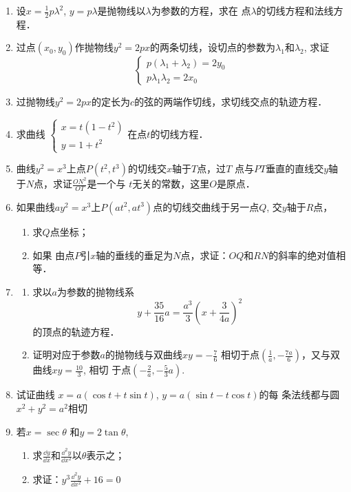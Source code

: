 \begin{ex}
\begin{enumerate}
    \item 设$x=\frac{1}{2}p\lambda^2$, $y=p\lambda$是抛物线以$\lambda$为参数的方程，求在
    点$\lambda$的切线方程和法线方程．
    \item 过点$(x_0,y_0)$作抛物线$y^2=2px$的两条切线，设切点的参数为$\lambda_1$和$\lambda_2$, 求证
    \[\begin{cases}
        p(\lambda_1+\lambda_2)=2y_0\\
        p\lambda_1\lambda_2=2x_0
    \end{cases}\]
    \item 过抛物线$y^2=2px$的定长为$c$的弦的两端作切线，求切线交点的轨迹方程．
    
    \item 求曲线
    $\begin{cases}
        x=t (1-t^2) \\ y=1+t^2
    \end{cases}$在点$t$的切线方程．

\item 曲线$y^2=x^3$上点$P(t^2,t^3)$的切线交$x$轴于$T$点，过$T$
点与$PT$垂直的直线交$y$轴于$N$点，求证$\frac{ON^2}{OT}$是一个与
$t$无关的常数，这里$O$是原点．
\item 如果曲线$ay^2=x^3$上$P(at^2,at^3)$点的切线交曲线于另一点$Q$, 交$y$轴于$R$点，
\begin{enumerate}
    \item 求$Q$点坐标；
    \item 如果
由点$P$引$x$轴的垂线的垂足为$N$点，求证：$OQ$和$RN$的斜率的绝对值相等．
\end{enumerate}
\item \begin{enumerate}
    \item 求以$a$为参数的抛物线系
\[y+\frac{35}{16}a=\frac{a^3}{3}\left(x+\frac{3}{4a}\right)^2\]
的顶点的轨迹方程．
\item 证明对应于参数$a$的抛物线与双曲线$xy=-\frac{7}{6}$ 
相切于点$\left(\frac{1}{a},-\frac{7a}{6}\right)$，又与双曲线$xy=\frac{10}{3}$, 相切
于点$\left(-\frac{2}{a},-\frac{5}{3}a\right)$.
\end{enumerate} 

\item 试证曲线
$x=a(\cos t+t\sin t)$, $y=a(\sin t-t\cos t)$的每
条法线都与圆$x^2+y^2=a^2$相切

\item 若$x=\sec\theta$ 和$y=2\tan\theta$,
\begin{enumerate}
    \item 求$\frac{\dd y}{\dd x}$和$\frac{\dd^2 y}{\dd x^2}$以$\theta$表示之；
\item 求证：$y^3\frac{\dd^2 y}{\dd x^2}+16=0$
\end{enumerate}


\end{enumerate}
\end{ex}
